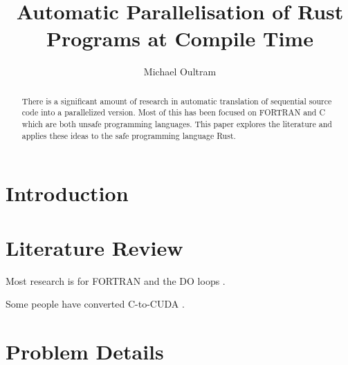 \documentclass[conference]{IEEEtran}
\begin{document}
\title{Automatic Parallelisation of Rust Programs at Compile Time}

\author{Michael Oultram}

\maketitle

\begin{abstract}
  There is a significant amount of research in automatic translation of sequential source code into a parallelized version. Most of this has been focused on FORTRAN and C which are both unsafe programming languages. This paper explores the literature and applies these ideas to the safe programming language Rust.
\end{abstract}

\section{Introduction}

\section{Literature Review}
Most research is for FORTRAN and the DO loops \parencite{Banerjee1993}.


Some people have converted C-to-CUDA \parencite{Baskaran2010, Verdoolaege2013}.

\section{Problem Details}

\printbibliography
\end{document}

